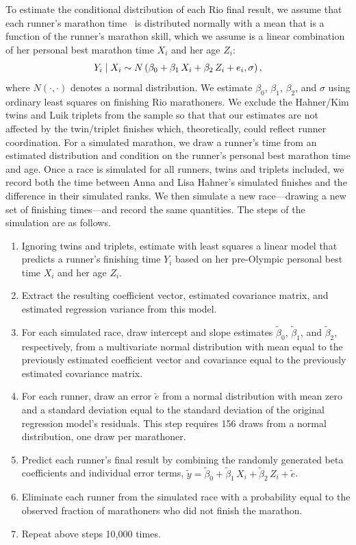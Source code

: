 \documentclass[12pt,titlepage]{article}
\begin{document}
To estimate the conditional distribution of each Rio final result, we
assume that each runner's marathon time \Yi\ is distributed normally
with a mean that is a function of the runner's marathon skill, which
we assume is a linear combination of her personal best marathon time
$X_i$ and her age $Z_i$:
$$Y_i \mid X_i \sim N\left(\beta_0 + \beta_1\,X_{i}  + \beta_2\,Z_{i} + e_i, \sigma\right),$$
where $N\left(\cdot,\cdot\right)$ denotes a normal
distribution. We estimate $\beta_0$,
$\beta_1$, $\beta_2$, and $\sigma$ using ordinary least squares on
finishing Rio marathoners.  We exclude the Hahner/Kim twins and Luik
triplets from the sample so that that our estimates are not affected
by the twin/triplet finishes which, theoretically, could reflect
runner coordination.  For a simulated marathon, we draw a runner's
time from an estimated distribution and condition on the runner's
personal best marathon time and age.  Once a race is simulated for all
runners, twins and triplets included, we record both the time between
Anna and Lisa Hahner's simulated finishes and the difference in their
simulated ranks.  We then simulate a new race---drawing a new set of
finishing times---and record the same quantities. The steps of the
simulation are as follows.
\begin{enumerate}
\item Ignoring twins and triplets, estimate with least squares a
  linear model that predicts a runner's finishing time $Y_i$ based on
  her pre-Olympic personal best time $X_i$ and her age $Z_i$.
\item Extract the resulting coefficient vector, estimated covariance
  matrix, and estimated regression variance from this model.
\item For each simulated race, draw intercept and slope estimates
  $\tilde{\beta}_0$, $\tilde{\beta}_1$, and
  $\tilde{\beta}_2$, respectively, from a multivariate normal
  distribution with mean equal to the previously estimated coefficient
  vector and covariance equal to the previously estimated covariance
  matrix.
\item For each runner, draw an error $\tilde{e}$ from a normal
  distribution with mean zero and a standard deviation equal to the
  standard deviation of the original regression model's residuals.
  This step requires 156 draws from a normal distribution, one draw
  per marathoner.
\item Predict each runner's final result by combining the randomly
  generated beta coefficients and individual error terms,
  $\tilde{y} = \tilde{\beta}_0 + \tilde{\beta}_1\,X_i +  \tilde{\beta}_2\,Z_i + \tilde{e}$.
\item Eliminate each runner from the simulated race with a probability
  equal to the observed fraction of marathoners who did not finish the
  marathon.
\item Repeat above steps 10,000 times.
\end{enumerate}
\end{document}
